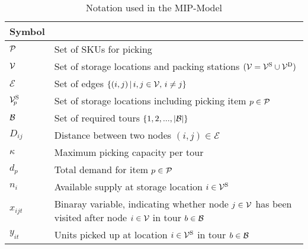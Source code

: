\begin{table}
    \centering
    \caption{Notation used in the MIP-Model}
    \label{tab:notation}
    \renewcommand{\arraystretch}{1.1}
    \begin{tabularx}{\columnwidth}{>{\hsize=0.1\columnwidth}X @{\hskip 3pt}|@{\hskip 5pt} >{\hsize=0.87\columnwidth}X}
        \hline
        Symbol & \multicolumn{1}{c}{Description} \\ \hline
        $\mathcal{P}$ & Set of SKUs for picking\\
        $\mathcal{V}$ & Set of storage locations and packing stations $(\mathcal{V}=\mathcal{V}^{\text{S}} \cup \mathcal{V}^{\text{D}})$\\
        $\mathcal{E}$ & Set of edges $\{(i,j) \, | \, i,j \in \mathcal{V}, \, i \neq j  \} $\\
        $\mathcal{V}_{\!p}^\text{S}$ & Set of storage locations including picking item $p \in \mathcal{P}$ \\
        $\mathcal{B}$ & Set of required tours $\{1,2,...,|\mathcal{B}|\}$\\
        $D_{ij}$ & Distance between two nodes $(i,j) \in \mathcal{E}$\\
	$\kappa$ & Maximum picking capacity per tour\\
	$d_{p}$ & Total demand for item $p \in \mathcal{P}$\\
	$n_{i}$ & Available supply at storage location $i \in \mathcal{V}^{\text{S}}$\\
        $x_{ijt}$ &  Binaray variable, indicating whether node $j \in \mathcal{V}$ has been visited after node $i \in \mathcal{V}$ in tour $b \in \mathcal{B}$ \\
        $y_{it}$ & Units picked up at location $i \in \mathcal{V}^{\text{S}}$ in tour $b \in \mathcal{B}$\\\hline
    \end{tabularx}

\end{table}
